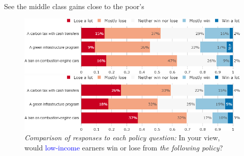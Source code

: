 \begin{framefont}{\small}
\begin{frame}{See the middle class gains close to the poor's}%
\begin{figure}[h!]
\centering
\caption{\textit{Comparison of responses to each policy question:} In your view, would the \textcolor{blue}{middle-class} win or lose from \textit{the following policy}?}
\includegraphics[width=.61\paperwidth]{../figures/FR/policies_win_lose_middle_FR.png}
\vspace{-.1cm}
\centering
\caption{\textit{Comparison of responses to each policy question:} In your view, would \textcolor{blue}{low-income} earners win or lose from \textit{the following policy}?}
\includegraphics[width=.61\paperwidth]{../figures/FR/policies_win_lose_poor_FR.png}
\end{figure}
\end{frame}


\end{framefont}
